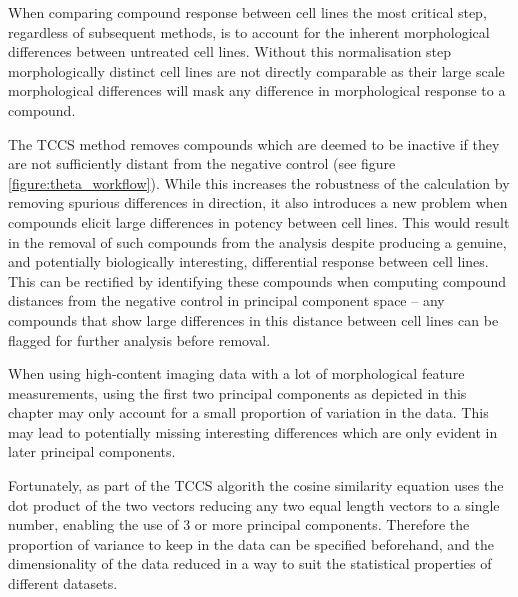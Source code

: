 \documentclass[a4paper,11pt,twoside,openright]{scrbook}
\begin{document}
When comparing compound response between cell lines the most critical step, regardless of subsequent methods, is to account for the inherent morphological differences between untreated cell lines.
Without this normalisation step morphologically distinct cell lines are not directly comparable as their large scale morphological differences will mask any difference in morphological response to a compound.

The TCCS method removes compounds which are deemed to be inactive if they are not sufficiently distant from the negative control (see figure \ref{figure:theta_workflow}).
While this increases the robustness of the calculation by removing spurious differences in direction, it also introduces a new problem when compounds elicit large differences in potency between cell lines.
This would result in the removal of such compounds from the analysis despite producing a genuine, and potentially biologically interesting, differential response between cell lines.
This can be rectified by identifying these compounds when computing compound distances from the negative control in principal component space -- any compounds that show large differences in this distance between cell lines can be flagged for further analysis before removal.


When using high-content imaging data with a lot of morphological feature measurements, using the first two principal components as depicted in this chapter may only account for a small proportion of variation in the data.
This may lead to potentially missing interesting differences which are only evident in later principal components.

Fortunately, as part of the TCCS algorith the cosine similarity equation uses the dot product of the two vectors reducing any two equal length vectors to a single number, enabling the use of 3 or more principal components.
Therefore the proportion of variance to keep in the data can be specified beforehand, and the dimensionality of the data reduced in a way to suit the statistical properties of different datasets.
\end{document}
